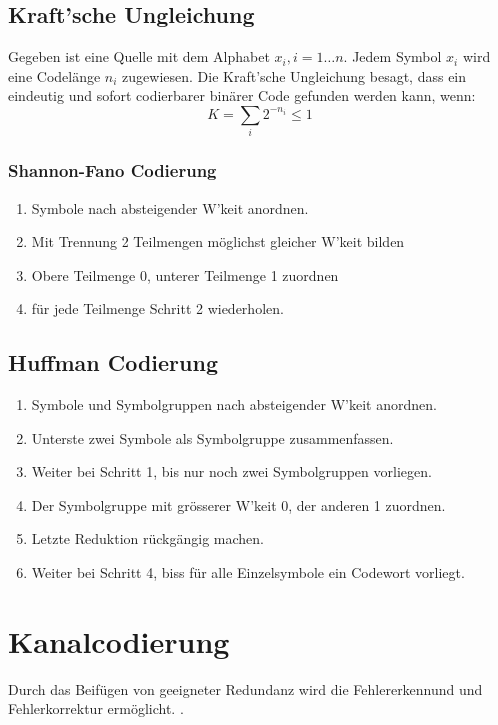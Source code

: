 \documentclass[a4paper]{article}
\begin{document}
\begin{twocolumn}
\subsection{Kraft'sche Ungleichung}
Gegeben ist eine Quelle mit dem Alphabet ${x_i}, i = {1 \ldots n}$. Jedem Symbol $x_i$ wird eine Codelänge $n_i$ 
zugewiesen. Die Kraft'sche Ungleichung besagt, dass ein eindeutig und sofort codierbarer binärer Code gefunden 
werden kann, wenn:
$$K = \sum_i 2^{-n_i} \leq 1$$

\renewcommand{\arraystretch}{1}

\subsubsection{Shannon-Fano Codierung}
\begin{enumerate}
  \item Symbole nach absteigender W'keit anordnen.
  \item Mit Trennung 2 Teilmengen möglichst gleicher W'keit bilden
  \item Obere Teilmenge 0, unterer Teilmenge 1 zuordnen
  \item für jede Teilmenge Schritt 2 wiederholen.
\end{enumerate}

\subsection{Huffman Codierung}
\begin{enumerate}
  \item Symbole und Symbolgruppen nach absteigender W'keit anordnen.
  \item Unterste zwei Symbole als Symbolgruppe zusammenfassen.
  \item Weiter bei Schritt 1, bis nur noch zwei Symbolgruppen vorliegen.
  \item Der Symbolgruppe mit grösserer W'keit 0, der anderen 1 zuordnen.
  \item Letzte Reduktion rückgängig machen.
  \item Weiter bei Schritt 4, biss für alle Einzelsymbole ein Codewort vorliegt.
\end{enumerate}

\renewcommand{\arraystretch}{1.5}

\section{Kanalcodierung}
Durch das Beifügen von geeigneter Redundanz wird die Fehlererkennund und Fehlerkorrektur
ermöglicht. .


\end{twocolumn}
\end{document}
